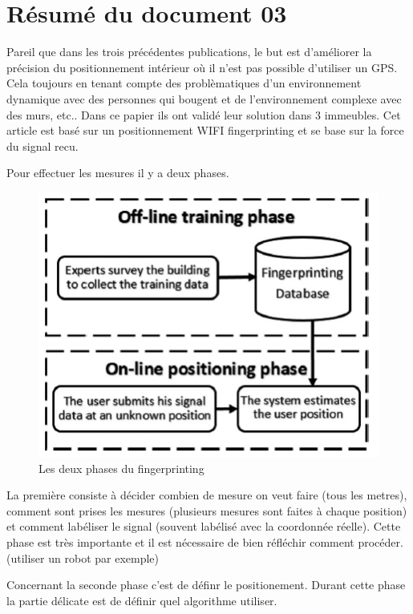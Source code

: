 \section{Résumé du document 03}
Pareil que dans les trois précédentes publications, le but est d'améliorer la précision du positionnement intérieur où il n'est pas possible d'utiliser un GPS. Cela toujours en tenant compte des problèmatiques d'un environnement dynamique avec des personnes qui bougent et de l'environnement complexe avec des murs, etc.. Dans ce papier ils ont validé leur solution dans 3 immeubles. Cet article est basé sur un positionnement WIFI fingerprinting et se base sur la force du signal recu.

Pour effectuer les mesures il y a deux phases. 

\begin{figure}[H]
	\begin{center}
		\includegraphics[scale=1]{figures/Fingerprinting.png}
		\caption{Les deux phases du fingerprinting}
		\label{fig:Fingerprinting} %
	\end{center}
\end{figure}

La première consiste à décider combien de mesure on veut faire (tous les metres), comment sont prises les mesures (plusieurs mesures sont faites à chaque position) et comment labéliser le signal (souvent labélisé avec la coordonnée réelle). Cette phase est très importante et il est nécessaire de bien réfléchir comment procéder. (utiliser un robot par exemple)

Concernant la seconde phase c'est de définr le positionement. Durant cette phase la partie délicate est de définir quel algorithme utiliser.

